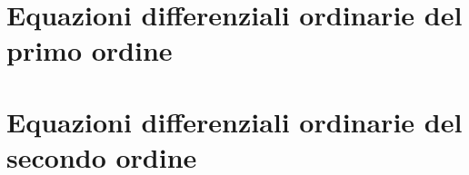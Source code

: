 





    \maketitle

    \tableofcontents
    \newpage
    \listoftheorems[ignoreall,show={teorema,definizione}]

    \renewcommand*{\theHchapter}{ch.\the\value{chapter}}

    \part{Equazioni differenziali ordinarie del primo ordine}

        
        
        
        
        

    \part{Equazioni differenziali ordinarie del secondo ordine}

        
        
    
